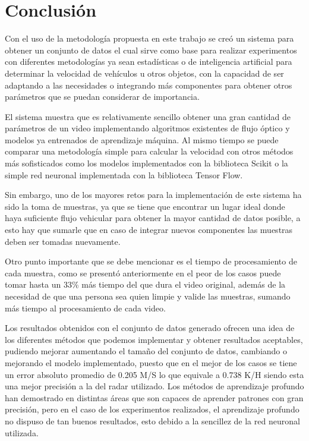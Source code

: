 \section{Conclusión}

Con el uso de la metodología propuesta en este trabajo se creó un sistema para obtener un conjunto de datos el cual sirve como base para realizar experimentos con diferentes metodologías ya sean estadísticas o de inteligencia artificial para determinar la velocidad de vehículos u otros objetos, con la capacidad de ser adaptando a las necesidades o integrando más componentes para obtener otros parámetros que se puedan considerar de importancia.

El sistema muestra que es relativamente sencillo obtener una gran cantidad de parámetros de un video implementando algoritmos existentes de flujo óptico y modelos ya entrenados de aprendizaje máquina. Al mismo tiempo se puede comparar una metodología simple para calcular la velocidad con otros métodos más sofisticados como los modelos implementados con la biblioteca Scikit o la simple red neuronal implementada con la biblioteca Tensor Flow.

Sin embargo, uno de los mayores retos para la implementación de este sistema ha sido la toma de muestras, ya que se tiene que encontrar un lugar ideal donde haya suficiente flujo vehicular para obtener la mayor cantidad de datos posible, a esto hay que sumarle que en caso de integrar nuevos componentes las muestras deben ser tomadas nuevamente.

Otro punto importante que se debe mencionar es el tiempo de procesamiento de cada muestra, como se presentó anteriormente en el peor de los casos puede tomar hasta un 33\% más tiempo del que dura el video original, además de la necesidad de que una persona sea quien limpie y valide las muestras, sumando más tiempo al procesamiento de cada video.

Los resultados obtenidos con el conjunto de datos generado ofrecen una idea de los diferentes métodos que podemos implementar y obtener resultados aceptables, pudiendo mejorar aumentando el tamaño del conjunto de datos, cambiando o mejorando el modelo implementado, puesto que en el mejor de los casos se tiene un error absoluto promedio de 0.205 M/S lo que equivale a 0.738 K/H siendo esta una mejor precisión a la del radar utilizado. Los métodos de aprendizaje profundo han demostrado en distintas áreas que son capaces de aprender patrones con gran precisión, pero en el caso de los experimentos realizados, el aprendizaje profundo no dispuso de tan buenos resultados, esto debido a la sencillez de la red neuronal utilizada.
